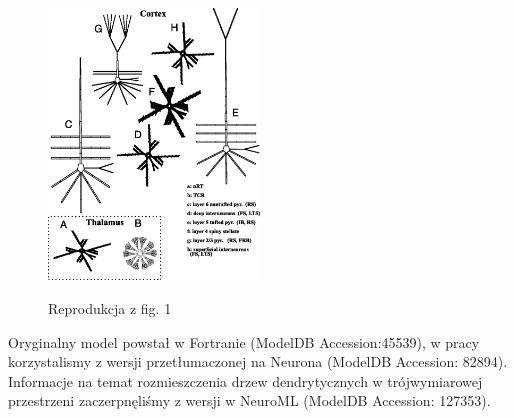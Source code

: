 \begin{figure}
\includegraphics[width=0.5\textwidth]{../ryciny/F1.jpg} 
\label{tarub_org}
\caption{Reprodukcja z \cite{Traub2005} fig. 1}
\end{figure}

Oryginalny model powstał w Fortranie (ModelDB Accession:45539), w pracy korzystalismy z wersji przetłumaczonej na Neurona (ModelDB Accession: 82894). Informacje na temat rozmieszczenia drzew dendrytycznych w trójwymiarowej przestrzeni zaczerpnęliśmy z wersji w NeuroML (ModelDB Accession: 127353).